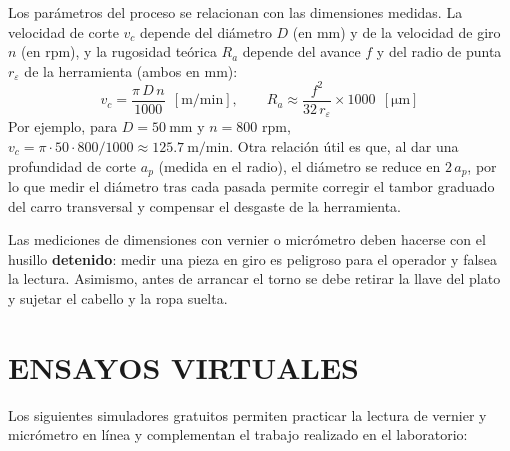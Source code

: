 \documentclass[12pt,a4paper]{article}
\begin{document}
Los parámetros del proceso se relacionan con las dimensiones medidas. La
velocidad de corte $v_c$ depende del diámetro $D$ (en mm) y de la velocidad de
giro $n$ (en rpm), y la rugosidad teórica $R_a$ depende del avance $f$ y del
radio de punta $r_\varepsilon$ de la herramienta (ambos en mm):
\[
	v_c = \frac{\pi\,D\,n}{1000}\ \ [\text{m/min}],
	\qquad
	R_a \approx \frac{f^{2}}{32\,r_\varepsilon}\times 1000\ \ [\si{\micro\metre}]
\]
Por ejemplo, para $D=\SI{50}{\milli\metre}$ y $n = 800$ rpm, $v_c = \pi\cdot
	50\cdot 800/1000 \approx \SI{125.7}{\metre\per\minute}$. Otra relación útil es
que, al dar una profundidad de corte $a_p$ (medida en el radio), el diámetro se
reduce en $2\,a_p$, por lo que medir el diámetro tras cada pasada permite
corregir el tambor graduado del carro transversal y compensar el desgaste de la
herramienta.

\begin{nota}[Seguridad]
	Las mediciones de dimensiones con vernier o micrómetro deben hacerse con el
	husillo \textbf{detenido}: medir una pieza en giro es peligroso para el
	operador
	y falsea la lectura. Asimismo, antes de arrancar el torno se debe retirar la
	llave del plato y sujetar el cabello y la ropa suelta.
\end{nota}

\section{ENSAYOS VIRTUALES}

Los siguientes simuladores gratuitos permiten practicar la lectura de vernier y
micrómetro en línea y complementan el trabajo realizado en el laboratorio:
\end{document}
